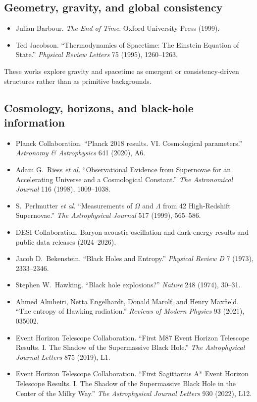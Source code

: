 \documentclass[11pt,twoside,openright]{book}
\begin{document}
\medskip

\subsection*{Geometry, gravity, and global consistency}

\begin{itemize}
  \setlength{\itemsep}{0.2em}
  \setlength{\parskip}{0pt}
  \item Julian Barbour. \emph{The End of Time}. Oxford University Press (1999).
  \item Ted Jacobson. ``Thermodynamics of Spacetime: The Einstein Equation of State.'' \emph{Physical Review Letters} 75 (1995), 1260--1263.
\end{itemize}

\noindent
These works explore gravity and spacetime as emergent or consistency-driven
structures rather than as primitive backgrounds.

\medskip

\subsection*{Cosmology, horizons, and black-hole information}

\begin{itemize}
  \setlength{\itemsep}{0.2em}
  \setlength{\parskip}{0pt}
  \item Planck Collaboration. ``Planck 2018 results. VI. Cosmological parameters.'' \emph{Astronomy \& Astrophysics} 641 (2020), A6.
  \item Adam G.\ Riess \emph{et al.} ``Observational Evidence from Supernovae for an Accelerating Universe and a Cosmological Constant.'' \emph{The Astronomical Journal} 116 (1998), 1009--1038.
  \item S.\ Perlmutter \emph{et al.} ``Measurements of $\Omega$ and $\Lambda$ from 42 High-Redshift Supernovae.'' \emph{The Astrophysical Journal} 517 (1999), 565--586.
  \item DESI Collaboration. Baryon-acoustic-oscillation and dark-energy results and public data releases (2024--2026).
  \item Jacob D.\ Bekenstein. ``Black Holes and Entropy.'' \emph{Physical Review D} 7 (1973), 2333--2346.
  \item Stephen W.\ Hawking. ``Black hole explosions?'' \emph{Nature} 248 (1974), 30--31.
  \item Ahmed Almheiri, Netta Engelhardt, Donald Marolf, and Henry Maxfield. ``The entropy of Hawking radiation.'' \emph{Reviews of Modern Physics} 93 (2021), 035002.
  \item Event Horizon Telescope Collaboration. ``First M87 Event Horizon Telescope Results. I. The Shadow of the Supermassive Black Hole.'' \emph{The Astrophysical Journal Letters} 875 (2019), L1.
  \item Event Horizon Telescope Collaboration. ``First Sagittarius A* Event Horizon Telescope Results. I. The Shadow of the Supermassive Black Hole in the Center of the Milky Way.'' \emph{The Astrophysical Journal Letters} 930 (2022), L12.
\end{itemize}
\end{document}
